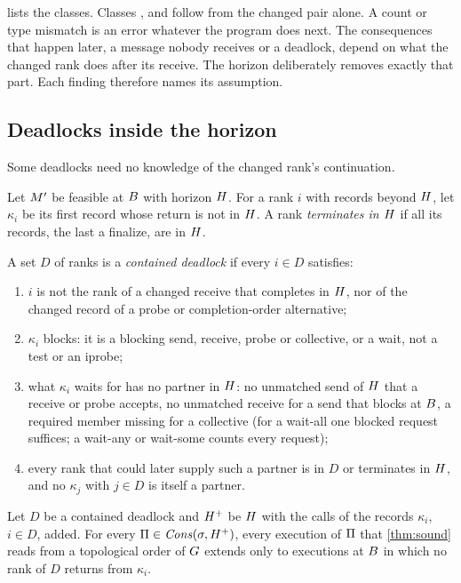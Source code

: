  lists the classes. Classes ,  and  follow from
the changed pair alone. A count or type mismatch is an error whatever the program does
next. The consequences that happen later, a message nobody receives or a deadlock,
depend on what the changed rank does after its receive. The horizon deliberately removes
exactly that part. Each finding therefore names its assumption.

\subsection{Deadlocks inside the horizon}
\label{sec:l1dead}

Some deadlocks need no knowledge of the changed rank's continuation.

Let $M'$ be feasible at $B$ with horizon $H$. For a rank $i$ with records beyond
$H$, let $\kappa_i$ be its first record whose return is not in $H$. A rank
\emph{terminates in $H$} if all its records, the last a finalize, are in $H$.

\begin{definition}
A set $D$ of ranks is a \emph{contained deadlock} if every $i\in D$ satisfies:
\begin{enumerate}[leftmargin=*,label=(D\arabic*)]
\item\label{D:changed} $i$ is not the rank of a changed receive that completes in $H$, nor
  of the changed record of a probe or completion-order alternative;
\item\label{D:block} $\kappa_i$ blocks: it is a blocking send, receive, probe or collective,
  or a wait, not a test or an iprobe;
\item\label{D:partner} what $\kappa_i$ waits for has no partner in $H$: no unmatched send
  of $H$ that a receive or probe accepts, no unmatched receive for a send that blocks at
  $B$, a required member missing for a collective (for a wait-all one blocked request
  suffices; a wait-any or wait-some counts every request);
\item\label{D:closed} every rank that could later supply such a partner is in $D$ or
  terminates in $H$, and no $\kappa_j$ with $j\in D$ is itself a partner.
\end{enumerate}
\end{definition}

\begin{theorem}
\label{thm:l1dead}
Let $D$ be a contained deadlock and $H^+$ be $H$ with the calls of the records
$\kappa_i$, $i\in D$, added. For every $\Pi\in\mathit{Cons}(\sigma,H^+)$, every execution of
$\Pi$ that \cref{thm:sound} reads from a topological order of $G$ extends only to
executions at $B$ in which no rank of $D$ returns from $\kappa_i$.
\end{theorem}


